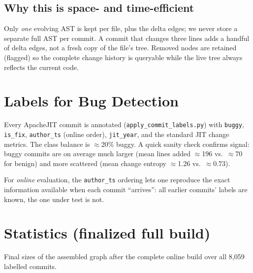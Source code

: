 \documentclass[11pt,a4paper]{article}
\newcommand{\code}[1]{\texttt{#1}}
\begin{document}
\subsection{Why this is space- and time-efficient}
Only \emph{one} evolving AST is kept per file, plus the delta edges; we never
store a separate full AST per commit. A commit that changes three lines adds a
handful of delta edges, not a fresh copy of the file's tree. Removed nodes are
retained (flagged) so the complete change history is queryable while the live
tree always reflects the current code.

\section{Labels for Bug Detection}
Every ApacheJIT commit is annotated (\texttt{apply\_commit\_labels.py}) with
\code{buggy}, \code{is\_fix}, \code{author\_ts} (online order), \code{jit\_year},
and the standard JIT change metrics. The class balance is $\approx$20\% buggy.
A quick sanity check confirms signal: buggy commits are on average much larger
(mean lines added $\approx$196 vs.\ $\approx$70 for benign) and more scattered
(mean change entropy $\approx$1.26 vs.\ $\approx$0.73).

For \emph{online} evaluation, the \code{author\_ts} ordering lets one reproduce
the exact information available when each commit ``arrives'': all earlier
commits' labels are known, the one under test is not.

\section{Statistics (finalized full build)}
Final sizes of the assembled graph after the complete online build over all
8{,}059 labelled commits.
\end{document}
